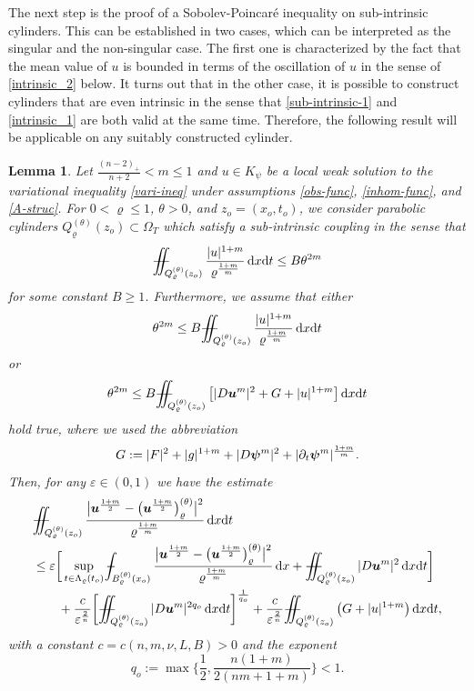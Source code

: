 \documentclass[a4paper, 10pt, american]{amsart}
\newtheorem{lemma}[theorem]{Lemma}
\numberwithin{theorem}{section}
\numberwithin{equation}{section}
\newcommand{\dxdt}{\,\mathrm{d}x\mathrm{d}t}
\newcommand{\dx}{\,\mathrm{d}x}
\renewcommand{\epsilon}{\varepsilon}
\renewcommand{\epsilon}{\varepsilon}
\renewcommand{\rho}{\varrho}
\newcommand{\power}[2]{\bm{#1^{\mbox{\unboldmath{\scriptsize$#2$}}}}}
\def\Xint#1{\mathchoice
    {\XXint\displaystyle\textstyle{#1}}%
    {\XXint\textstyle\scriptstyle{#1}}%
    {\XXint\scriptstyle\scriptscriptstyle{#1}}%
    {\XXint\scriptscriptstyle\scriptscriptstyle{#1}}%
    \!\int}
\def\XXint#1#2#3{\setbox0=\hbox{$#1{#2#3}{\int}$}
    \vcenter{\hbox{$#2#3$}}\kern-0.5\wd0}
\def\bint{\Xint-}
\def\Xiint#1{\mathchoice
    {\XXiint\displaystyle\textstyle{#1}}%
    {\XXiint\textstyle\scriptstyle{#1}}%
    {\XXiint\scriptstyle\scriptscriptstyle{#1}}%
    {\XXiint\scriptscriptstyle\scriptscriptstyle{#1}}%
    \!\iint}
\def\XXiint#1#2#3{\setbox0=\hbox{$#1{#2#3}{\iint}$}
    \vcenter{\hbox{$#2#3$}}\kern-0.5\wd0}
\def\biint{\Xiint{-\!-}}
\begin{document}
The next step is the proof of a Sobolev-Poincar\'e inequality on
sub-intrinsic cylinders. This can be established in two cases, which
can be interpreted as the singular and the non-singular case.
The first one is characterized by the fact that the mean value
of $u$ is bounded in terms of the oscillation of $u$ in the sense
of \eqref{intrinsic_2} below. It turns out that in the other case, it
is possible to construct cylinders that are even intrinsic in the
sense that \eqref{sub-intrinsic-1} and \eqref{intrinsic_1} are both
valid at the same time. Therefore, the following
result will be applicable on any suitably constructed cylinder.


\begin{lemma}\label{lem:sobolev-poin}
Let $\frac{(n-2)_+}{n+2}<m\le1$ and $u\in K_\psi$ be a local weak
solution to the variational inequality \eqref{vari-ineq} under assumptions \eqref{obs-func}, \eqref{inhom-func}, and \eqref{A-struc}. 
For $0<\rho\le1$, $\theta>0$, and $z_o=(x_o,t_o)$, 
we consider parabolic cylinders $Q_\rho^{(\theta)}(z_o)\subset\Omega_T$
which satisfy a sub-intrinsic coupling in the sense that
\begin{align}\label{sub-intrinsic-1}
\biint_{Q_{\rho}^{(\theta)}(z_o)} \frac{|u|^{1+m}}{\rho^{\frac{1+m}{m}}} \dxdt
\le
B\theta^{2m}
\end{align}
for some constant $B\ge1$.
Furthermore, we assume that either
\begin{align}\label{intrinsic_1}
\theta^{2m} \le B\biint_{Q_{\rho}^{(\theta)}(z_o)} \frac{|u|^{1+m}}{\rho^{\frac{1+m}{m}}} \dxdt
\end{align}
or
\begin{align}\label{intrinsic_2}
\theta^{2m} \le B\biint_{Q_{\rho}^{(\theta)}(z_o)} \big[ |D\power um|^2+G+|u|^{1+m}\big] \dxdt
\end{align}
hold true, where we used the abbreviation
$$G:=|F|^2+|g|^{1+m} +|D\power\psi m|^2+|\partial_t\power\psi m|^{\frac{1+m}m}.$$
Then, for any $\varepsilon\in(0,1)$ we have the estimate
\begin{align}\label{desired-est}
\nonumber
&\biint_{Q_\rho^{(\theta)}(z_o)} \frac{\big| \power u{\frac{1+m}2} -\big(\power u{\frac{1+m}2}\big)_\rho^{(\theta)} \big|^2}{\rho^{\frac{1+m}m}} \dxdt\\\nonumber
&\le
\epsilon\bigg[ \sup_{t\in\Lambda_\rho(t_o)} \bint_{B_\rho^{(\theta)}(x_o)} \frac{\big| \power u{\frac{1+m}2} -\big(\power u{\frac{1+m}2}\big)_\rho^{(\theta)} \big|^2}{\rho^{\frac{1+m}m}} \dx
+
 \biint_{Q_\rho^{(\theta)}(z_o)} |D\power um|^2 \dxdt \bigg]\\
&\qquad+
\frac{ c}{\epsilon^{\frac{2}{n}}} \bigg[\biint_{Q_\rho^{(\theta)}(z_o)} |D\power um|^{2q_o}\dxdt\bigg]^{\frac1{q_o}}
+
\frac{c}{\epsilon^{\frac{2}{n}}}\biint_{Q_\rho^{(\theta)}(z_o)} \big(G+|u|^{1+m}\big)\dxdt,
\end{align}
with a constant $c=c(n,m,\nu,L,B)>0$ and the exponent
$$q_o:=\max\Bigg\{\frac12, \frac{n(1+m)}{2(nm+1+m)}\Bigg\}<1.$$
\end{lemma}
\end{document}
